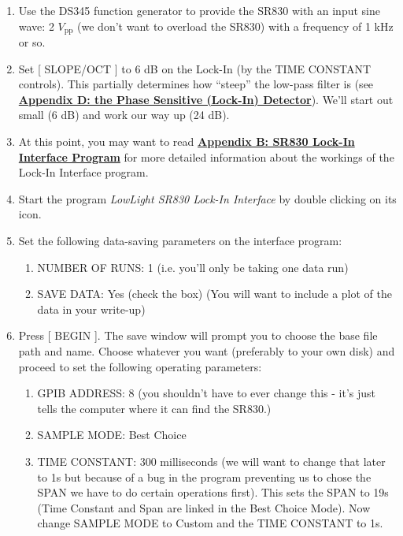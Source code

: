 \documentclass{../lab}
\begin{document}
\begin{enumerate}
    \item Use the DS345 function generator to provide the SR830 with an input sine wave: 2 $V_\text{pp}$ (we don't want to overload the SR830) with a frequency of 1 kHz or so.

    \item Set [ SLOPE/OCT ] to 6 dB on the Lock-In (by the TIME CONSTANT controls). This partially determines how ``steep'' the low-pass filter is (see \href{http://experimentationlab.berkeley.edu/node/99}{\textbf{Appendix D: the Phase Sensitive (Lock-In) Detector}}). We'll start out small (6 dB) and work our way up (24 dB).

    \item At this point, you may want to read \href{http://experimentationlab.berkeley.edu/node/97}{\textbf{Appendix B: SR830 Lock-In Interface Program}} for more detailed information about the workings of the Lock-In Interface program.

    \item Start the program \emph{LowLight SR830 Lock-In Interface} by double clicking on its icon.

    \item Set the following data-saving parameters on the interface program:
    \begin{enumerate}
        \item NUMBER OF RUNS: 1 (i.e. you'll only be taking one data run)

        \item SAVE DATA: Yes (check the box) (You will want to include a plot of the data in your write-up)

    \end{enumerate}

    \item Press [ BEGIN ]. The save window will prompt you to choose the base file path and name. Choose whatever you want (preferably to your own disk) and proceed to set the following operating parameters:
    \begin{enumerate}
        \item GPIB ADDRESS: 8 (you shouldn't have to ever change this - it's just tells the computer where it can find the SR830.)

        \item SAMPLE MODE: Best Choice

        \item TIME CONSTANT: 300 milliseconds (we will want to change that later to 1s but because of a bug in the program preventing us to chose the SPAN we have to do certain operations first). This sets the SPAN to 19s (Time Constant and Span are linked in the Best Choice Mode). Now change SAMPLE MODE to Custom and the TIME CONSTANT to 1s.


\end{enumerate}
\end{enumerate}
\end{document}
